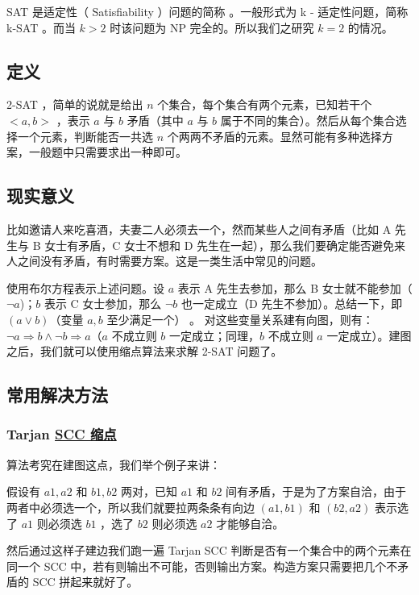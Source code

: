 
\begin{QUOTE}{}{}
SAT 是适定性（ Satisfiability ）问题的简称 。一般形式为 k - 适定性问题，简称 k-SAT 。而当 $k>2$ 时该问题为 NP 完全的。所以我们之研究 $k=2$ 的情况。
\end{QUOTE}

\subsection{定义}

2-SAT ，简单的说就是给出 $n$ 个集合，每个集合有两个元素，已知若干个 $<a,b>$ ，表示 $a$ 与 $b$ 矛盾（其中 $a$ 与 $b$ 属于不同的集合）。然后从每个集合选择一个元素，判断能否一共选 $n$ 个两两不矛盾的元素。显然可能有多种选择方案，一般题中只需要求出一种即可。

\subsection{现实意义}

比如邀请人来吃喜酒，夫妻二人必须去一个，然而某些人之间有矛盾（比如 A 先生与 B 女士有矛盾，C 女士不想和 D 先生在一起），那么我们要确定能否避免来人之间没有矛盾，有时需要方案。这是一类生活中常见的问题。

使用布尔方程表示上述问题。设 $a$ 表示 A 先生去参加，那么 B 女士就不能参加（$\neg a$)；$b$ 表示 C 女士参加，那么 $\neg b$ 也一定成立（D 先生不参加）。总结一下，即 $(a \vee b)$（变量 $a, b$ 至少满足一个） 。 对这些变量关系建有向图，则有：$\neg a\Rightarrow b\wedge\neg b\Rightarrow a$（$a$ 不成立则 $b$ 一定成立；同理，$b$ 不成立则 $a$ 一定成立）。建图之后，我们就可以使用缩点算法来求解 2-SAT 问题了。

\subsection{常用解决方法}

\subsubsection{Tarjan \href{/graph/scc}{SCC 缩点}}

算法考究在建图这点，我们举个例子来讲：

假设有 ${a1,a2}$ 和 ${b1,b2}$ 两对，已知 $a1$ 和 $b2$ 间有矛盾，于是为了方案自洽，由于两者中必须选一个，所以我们就要拉两条条有向边 $(a1,b1)$ 和 $(b2,a2)$ 表示选了 $a1$ 则必须选 $b1$ ，选了 $b2$ 则必须选 $a2$ 才能够自洽。

然后通过这样子建边我们跑一遍 Tarjan SCC 判断是否有一个集合中的两个元素在同一个 SCC 中，若有则输出不可能，否则输出方案。构造方案只需要把几个不矛盾的 SCC 拼起来就好了。

